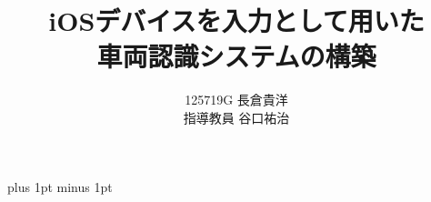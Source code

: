\documentclass[a4j,12pt]{jreport}
\title{iOSデバイスを入力として用いた\\
車両認識システムの構築}
\author{125719G 長倉貴洋 \\ 指導教員 {谷口祐治}}
\begin{document}
\maketitle
\baselineskip 17pt plus 1pt minus 1pt

\setcounter{page}{0}

\tableofcontents
\listoffigures
\listoftables














\end{document}
